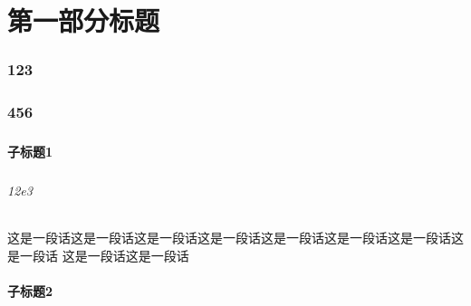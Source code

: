 \documentclass[10pt,mathserif]{beamer}%
\title{\hei{标题标题标题标题标题标题标题标题标题标题}}
\subtitle{\hei{\projectName}}
\institute[导航栏底部]{组织名} %
\author{\hei{rqdmap}}
\date{\song{\today}} %
\begin{document}
{\xdbg {}}%



\part{第一部分标题}
\section{123}
\begin{frame}[fragile]
    \frametitle{\hei{\currentdeepesttitle}}
    \begin{spacing}{1.5} \begin{heienv}
    \setlength{\parindent}{2em}

    \end{heienv} \end{spacing}
\end{frame}

\section{456}
\begin{frame}[fragile]
    \frametitle{\hei{\currentdeepesttitle}}
    \begin{spacing}{1.5} \begin{heienv}
    \setlength{\parindent}{2em}
        
    \end{heienv} \end{spacing}
\end{frame}

\subsection{子标题1}
\begin{frame}[fragile]
    \frametitle{\hei{\currentdeepesttitle}}
    \framesubtitle{12e3}
    \begin{spacing}{1.5} \begin{heienv}
    \setlength{\parindent}{2em}

这是一段话这是一段话这是一段话这是一段话这是一段话这是一段话这是一段话这是一段话
这是一段话这是一段话
        
    \end{heienv} \end{spacing}
\end{frame}

\subsection{子标题2}
\begin{frame}[fragile]
    \frametitle{\hei{\currentdeepesttitle}}
    \begin{spacing}{1.5} \begin{heienv}
    \setlength{\parindent}{2em}
        
    \end{heienv} \end{spacing}
\end{frame}
\end{document}

